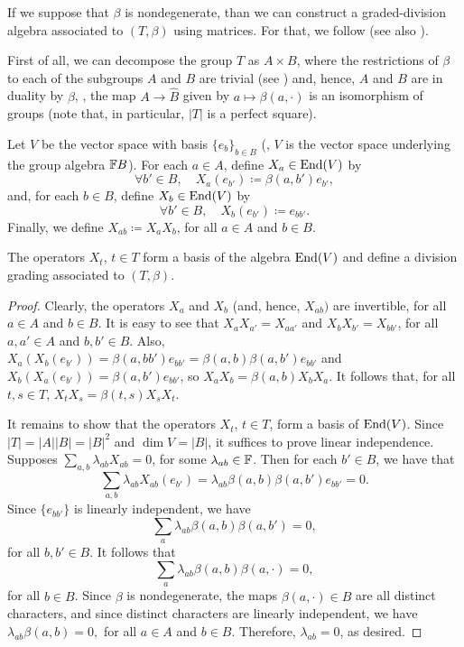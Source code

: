 If we suppose that $\beta$ is nondegenerate, than we can construct a graded-division algebra associated to $(T,\beta)$ using matrices. 
For that, we follow \cite[Remark 18]{EK15} (see also \cite[Remark 2.16]{livromicha}).

First of all, we can decompose the group $T$ as $A\times B$, where the restrictions of $\beta$ to each of the subgroups $A$ and $B$ are trivial (see \cite[page 36]{livromicha}) and, hence, $A$ and $B$ are in duality by $\beta$, \ie, the map $A \to \widehat B$ given by $a \mapsto \beta(a, \cdot)$ is an isomorphism of groups (note that, in particular, $|T|$ is a perfect square). 

Let $V$ be the vector space with basis $\{e_b\}_{b\in B}$ (\ie, $V$ is the vector space underlying the group algebra $\mathbb{F} B$). 
For each $a\in A$, define $X_a\in \operatorname{End}(V)$ by
\[
    \forall b' \in B, \quad X_a (e_{b'}) \coloneqq \beta(a, b')e_{b'},
\]
and, for each $b\in B$, define $X_b\in \operatorname{End}(V)$ by
\[
    \forall b' \in B, \quad X_b (e_{b'}) \coloneqq e_{bb'}.
\]
Finally, we define $X_{ab} \coloneqq X_a X_b$, for all $a\in A$ and $b\in B$. 

\begin{prop}\label{prop:X_t-is-basis}
    The operators $X_t$, $t\in T$ form a basis of the algebra $\operatorname{End}(V)$ and define a division grading associated to $(T, \beta)$. 
\end{prop}

\begin{proof}
    Clearly, the operators $X_a$ and $X_b$ (and, hence, $X_{ab})$ are invertible, for all $a\in A$ and $b\in B$. 
    It is easy to see that $X_a X_{a'} = X_{aa'}$ and $X_{b} X_{b'} = X_{bb'}$, for all $a, a' \in A$ and $b, b'\in B$. 
    Also, $X_a ( X_b(e_{b'}) ) = \beta(a, bb') e_{bb'} = \beta(a, b) \beta(a,b') e_{bb'}$ and $X_b ( X_a(e_{b'}) ) = \beta(a, b') e_{bb'}$, so $X_a X_b = \beta(a,b) X_b X_a$. 
    It follows that, for all $t,s \in T$, $X_t X_s = \beta(t,s) X_s X_t$.

    It remains to show that the operators $X_t$, $t\in T$, form a basis of $\operatorname{End}(V)$. 
    Since $|T| = |A||B| = |B|^2$ and $\dim V = |B|$, it suffices to prove linear independence. 
    Supposes $\sum_{a,b} \lambda_{ab} X_{ab} = 0$, for some $\lambda_{ab} \in \mathbb{F}$. 
    Then for each $b' \in B$, we have that
    \[
        \sum_{a,b} \lambda_{ab} X_{ab} (e_{b'}) = \lambda_{ab} \beta(a, b) \beta(a,b') e_{bb'} = 0.
    \]
    Since $\{ e_{bb'} \}$ is linearly independent, we have
    \[
        \sum_a \lambda_{ab} \beta(a, b) \beta(a,b') = 0,
    \]
    for all $b,b' \in B$. 
    It follows that
    \[
        \sum_a \lambda_{ab} \beta(a, b) \beta(a, \cdot) = 0,
    \]
    for all $b\in B$. 
    Since $\beta$ is nondegenerate, the maps $\beta(a, \cdot) \in \widehat B$ are all distinct characters, and since distinct characters are linearly independent, we have
    $
        \lambda_{ab} \beta(a, b) = 0,
    $
    for all $a\in A$ and $b\in B$. 
    Therefore, $\lambda_{ab} = 0$, as desired. 
\end{proof}

